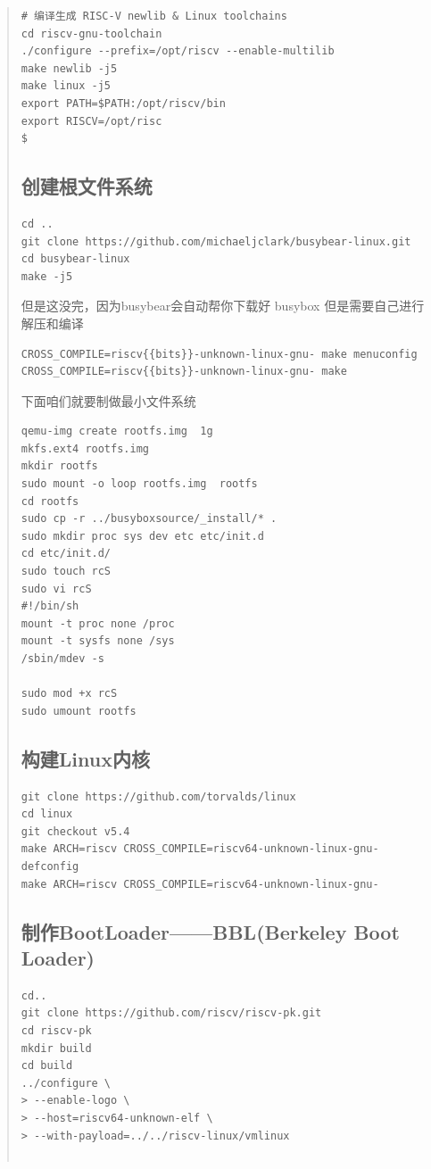 \begin{abstract}
\begin{sloppypar}
\begin{lstlisting}
# 编译生成 RISC-V newlib & Linux toolchains
cd riscv-gnu-toolchain
./configure --prefix=/opt/riscv --enable-multilib
make newlib -j5
make linux -j5
export PATH=$PATH:/opt/riscv/bin
export RISCV=/opt/risc
$
\end{lstlisting}

\subsection*{创建根文件系统}
\begin{lstlisting}
cd ..
git clone https://github.com/michaeljclark/busybear-linux.git
cd busybear-linux
make -j5
\end{lstlisting}

但是这没完，因为busybear会自动帮你下载好 busybox 但是需要自己进行解压和编译

\begin{lstlisting}
CROSS_COMPILE=riscv{{bits}}-unknown-linux-gnu- make menuconfig
CROSS_COMPILE=riscv{{bits}}-unknown-linux-gnu- make
\end{lstlisting}

下面咱们就要制做最小文件系统
\begin{lstlisting}
qemu-img create rootfs.img  1g
mkfs.ext4 rootfs.img
mkdir rootfs
sudo mount -o loop rootfs.img  rootfs
cd rootfs
sudo cp -r ../busyboxsource/_install/* .
sudo mkdir proc sys dev etc etc/init.d
cd etc/init.d/
sudo touch rcS
sudo vi rcS
#!/bin/sh
mount -t proc none /proc
mount -t sysfs none /sys
/sbin/mdev -s

sudo mod +x rcS
sudo umount rootfs
\end{lstlisting}

\subsection*{构建Linux内核}
\begin{lstlisting}
git clone https://github.com/torvalds/linux
cd linux
git checkout v5.4
make ARCH=riscv CROSS_COMPILE=riscv64-unknown-linux-gnu- defconfig
make ARCH=riscv CROSS_COMPILE=riscv64-unknown-linux-gnu-
\end{lstlisting}

\subsection*{制作BootLoader——BBL(Berkeley Boot Loader)}
\begin{lstlisting}
cd..
git clone https://github.com/riscv/riscv-pk.git
cd riscv-pk
mkdir build
cd build
../configure \
> --enable-logo \
> --host=riscv64-unknown-elf \
> --with-payload=../../riscv-linux/vmlinux


\end{lstlisting}
\end{sloppypar}
\end{abstract}
